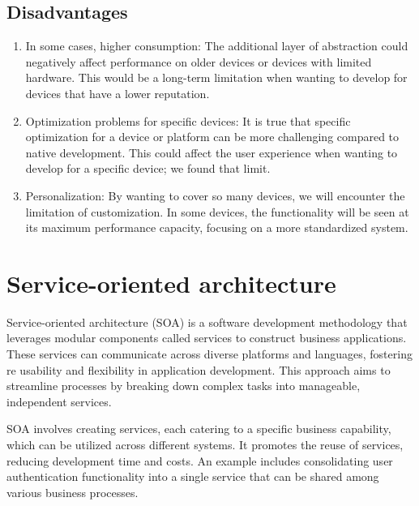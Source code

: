 \documentclass[12pt,a4paper, twosite]{article}
\begin{document}
	\subsection{Disadvantages}
	\label{sec:constraints}
	
	\begin{enumerate}
		\item In some cases, higher consumption: The additional layer of abstraction could negatively affect performance on older devices or devices with limited hardware. This would be a long-term limitation when wanting to develop for devices that have a lower reputation.
		
		\item Optimization problems for specific devices: It is true that specific optimization for a device or platform can be more challenging compared to native development. This could affect the user experience when wanting to develop for a specific device; we found that limit.
		
		\item Personalization: By wanting to cover so many devices, we will encounter the limitation of customization. In some devices, the functionality will be seen at its maximum performance capacity, focusing on a more standardized system.
	\end{enumerate}
	

\section{Service-oriented architecture }
	\label{sec:specific-requirements}
	
	Service-oriented architecture (SOA) is a software development methodology that leverages modular components called services to construct business applications. These services can communicate across diverse platforms and languages, fostering re usability and flexibility in application development. This approach aims to streamline processes by breaking down complex tasks into manageable, independent services.
	
	SOA involves creating services, each catering to a specific business capability, which can be utilized across different systems. It promotes the reuse of services, reducing development time and costs. An example includes consolidating user authentication functionality into a single service that can be shared among various business processes.
\end{document}
